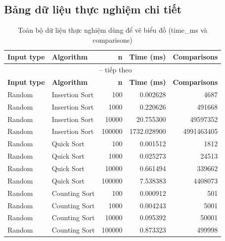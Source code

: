 \subsection{Bảng dữ liệu thực nghiệm chi tiết}

\begin{center}
\scriptsize
\setlength{\LTleft}{0pt}
\setlength{\LTright}{0pt}
\begin{longtable}{llrrr}
\caption{Toàn bộ dữ liệu thực nghiệm dùng để vẽ biểu đồ (time\_ms và comparisons)}\label{tab:raw-benchmark-data}\\
\toprule
\textbf{Input type} & \textbf{Algorithm} & \textbf{n} & \textbf{Time (ms)} & \textbf{Comparisons} \\
\midrule
\endfirsthead

\multicolumn{5}{c}{\tablename\ \thetable{} -- tiếp theo}\\
\toprule
\textbf{Input type} & \textbf{Algorithm} & \textbf{n} & \textbf{Time (ms)} & \textbf{Comparisons} \\
\midrule
\endhead

\bottomrule
\endfoot

Random & Insertion Sort & 100 & 0.002628 & 4687 \\
Random & Insertion Sort & 1000 & 0.220626 & 491668 \\
Random & Insertion Sort & 10000 & 20.755300 & 49597352 \\
Random & Insertion Sort & 100000 & 1732.028900 & 4991463405 \\
Random & Quick Sort & 100 & 0.001512 & 1812 \\
Random & Quick Sort & 1000 & 0.025273 & 24513 \\
Random & Quick Sort & 10000 & 0.661494 & 339662 \\
Random & Quick Sort & 100000 & 7.538383 & 4408073 \\
Random & Counting Sort & 100 & 0.000912 & 501 \\
Random & Counting Sort & 1000 & 0.004243 & 5001 \\
Random & Counting Sort & 10000 & 0.095392 & 50001 \\
Random & Counting Sort & 100000 & 0.873323 & 499998 \\


\end{longtable}
\end{center}
